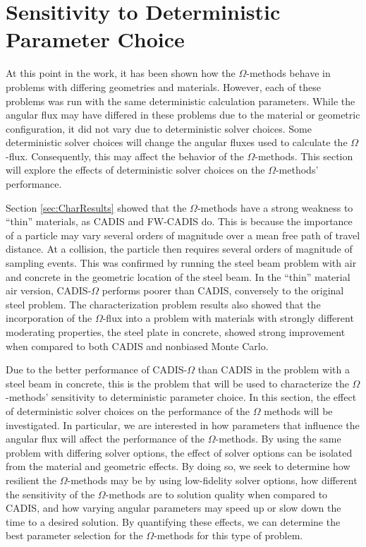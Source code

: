 \section{Sensitivity to Deterministic Parameter Choice}
\label{sec:AngleResults}

At this point in the work, it has been shown how the $\Omega$-methods
behave in problems with differing geometries and materials.
However, each of these problems was run with the same deterministic calculation
parameters. While the angular flux may have differed in these problems due to
the material or geometric configuration, it did not vary due to deterministic
solver choices. Some deterministic solver choices will change the angular
fluxes used to calculate the $\Omega$-flux. Consequently, this may affect the
behavior of the $\Omega$-methods. This section will
explore the effects of deterministic solver
choices on the $\Omega$-methods' performance.

Section \ref{sec:CharResults} showed that the $\Omega$-methods have a strong
weakness to ``thin'' materials, as CADIS and FW-CADIS do. This is because the
importance of a particle may vary several orders of magnitude over a mean free
path of travel distance. At a collision, the particle then requires
several orders of
magnitude of sampling events. This was confirmed by
running the steel beam problem with air and concrete in the geometric location
of the steel beam. In
the ``thin'' material air version, CADIS-$\Omega$ performs poorer than CADIS,
conversely to the original steel problem.
The characterization problem results also showed that
the incorporation of the $\Omega$-flux into a problem with materials with
strongly different moderating properties, the steel plate in concrete, showed
strong improvement when compared to both CADIS and nonbiased Monte Carlo.

Due to the better performance of CADIS-$\Omega$ than CADIS
in the problem with a steel beam in concrete, this is the problem that will be
used to characterize the $\Omega$-methods' sensitivity to deterministic
parameter choice.
In this section, the effect of deterministic solver choices on the
performance of the $\Omega$ methods will be investigated. In particular, we are
interested in how parameters that influence the angular flux will affect the
performance of the $\Omega$-methods. By using the same problem
with differing solver options, the effect of solver options can be isolated from
the material and geometric effects. By doing so, we seek to determine how
resilient the $\Omega$-methods may be by using low-fidelity solver options, how
different the sensitivity of the $\Omega$-methods are to solution quality when
compared to CADIS, and how varying angular parameters may speed up or slow down
the time to a desired solution. By quantifying these effects, we can determine
the best parameter selection for the $\Omega$-methods for this type of problem.

